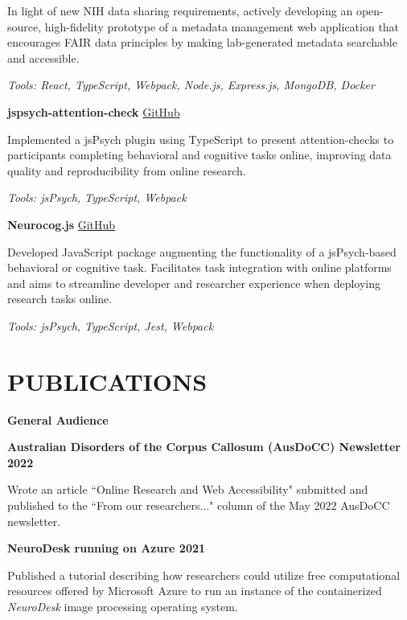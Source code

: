 \documentclass{article}
\begin{document}
  In light of new NIH data sharing requirements, actively developing an open-source, high-fidelity prototype of a metadata management web application that encourages FAIR data principles by making lab-generated metadata searchable and accessible.

  \textit{Tools: React, TypeScript, Webpack, Node.js, Express.js, MongoDB, Docker}

  \medbreak

  \textbf{jspsych-attention-check} \hfill \href{https://github.com/henryjburg/jspsych-attention-check}{\color{blue}GitHub}

  Implemented a jsPsych plugin using TypeScript to present attention-checks to participants completing behavioral and cognitive tasks online, improving data quality and reproducibility from online research.

  \textit{Tools: jsPsych, TypeScript, Webpack}

  \medbreak

  \textbf{Neurocog.js} \hfill \href{https://github.com/henryjburg/Neurocog.js}{\color{blue}GitHub}

  Developed JavaScript package augmenting the functionality of a jsPsych-based behavioral or cognitive task. Facilitates task integration with online platforms and aims to streamline developer and researcher experience when deploying research tasks online.

  \textit{Tools: jsPsych, TypeScript, Jest, Webpack}

  \pagebreak

  \section*{\centering\uppercase{Publications}}

  {\large\textbf{General Audience}}

  \textbf{Australian Disorders of the Corpus Callosum (AusDoCC) Newsletter \hfill 2022}

  Wrote an article ``Online Research and Web Accessibility" submitted and published to the ``From our researchers..." column of the May 2022 AusDoCC newsletter.

  \medbreak

  \textbf{NeuroDesk running on Azure \hfill 2021}

  Published a tutorial describing how researchers could utilize free computational resources offered by Microsoft Azure to run an instance of the containerized \textit{NeuroDesk} image processing operating system.
\end{document}
